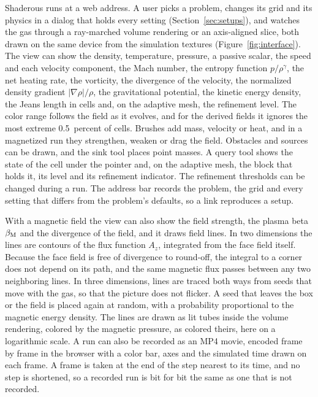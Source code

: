 \documentclass[twocolumn]{aastex701}
\begin{document}
Shaderous runs at a web address. A user picks a problem, changes its grid and its physics in a dialog that holds every setting (Section~\ref{sec:setups}), and watches the gas through a ray-marched volume rendering or an axis-aligned slice, both drawn on the same device from the simulation textures (Figure~\ref{fig:interface}). The view can show the density, temperature, pressure, a passive scalar, the speed and each velocity component, the Mach number, the entropy function $p/\rho^\gamma$, the net heating rate, the vorticity, the divergence of the velocity, the normalized density gradient $|\nabla\rho|/\rho$, the gravitational potential, the kinetic energy density, the Jeans length in cells and, on the adaptive mesh, the refinement level. The color range follows the field as it evolves, and for the derived fields it ignores the most extreme 0.5~percent of cells. Brushes add mass, velocity or heat, and in a magnetized run they strengthen, weaken or drag the field. Obstacles and sources can be drawn, and the sink tool places point masses. A query tool shows the state of the cell under the pointer and, on the adaptive mesh, the block that holds it, its level and its refinement indicator. The refinement thresholds can be changed during a run. The address bar records the problem, the grid and every setting that differs from the problem's defaults, so a link reproduces a setup.

With a magnetic field the view can also show the field strength, the plasma beta $\beta_{\rm M}$ and the divergence of the field, and it draws field lines. In two dimensions the lines are contours of the flux function $A_z$, integrated from the face field itself. Because the face field is free of divergence to round-off, the integral to a corner does not depend on its path, and the same magnetic flux passes between any two neighboring lines. In three dimensions, lines are traced both ways from seeds that move with the gas, so that the picture does not flicker. A seed that leaves the box or the field is placed again at random, with a probability proportional to the magnetic energy density. The lines are drawn as lit tubes inside the volume rendering, colored by the magnetic pressure, as \citet{GuillochonMcCourt2017} colored theirs, here on a logarithmic scale. A run can also be recorded as an MP4 movie, encoded frame by frame in the browser with a color bar, axes and the simulated time drawn on each frame. A frame is taken at the end of the step nearest to its time, and no step is shortened, so a recorded run is bit for bit the same as one that is not recorded.
\end{document}
